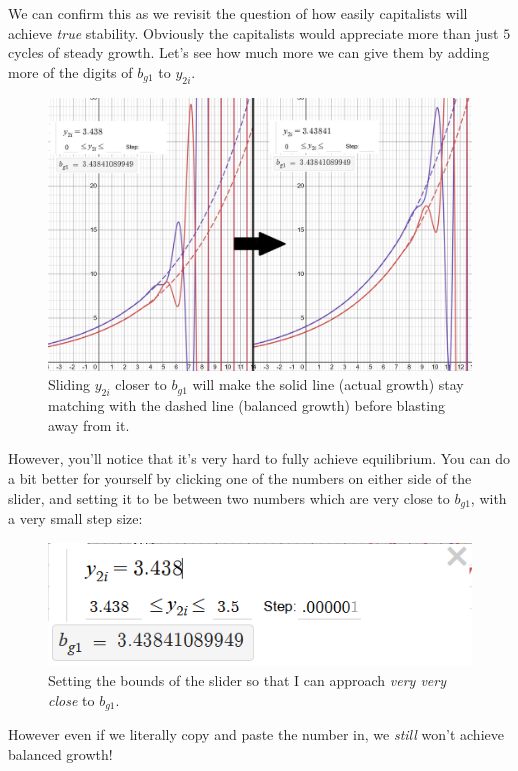 \documentclass{article}
\theoremstyle{theorem}
\begin{document}
We can confirm this as we revisit the question of how easily capitalists will achieve \emph{true} stability. Obviously the capitalists would appreciate more than just $5$ cycles of steady growth. Let's see how much more we can give them by adding more of the digits of $b_{g1}$ to $y_{2i}$. 
\begin{figure}[H]
\centering
\includegraphics[scale=.6]{Images/approachingEQ}
\caption{Sliding $y_{2i}$ closer to $b_{g1}$ will make the solid line (actual growth) stay matching with the dashed line (balanced growth) before blasting away from it.}
\end{figure} 
However, you'll notice that it's very hard to fully achieve equilibrium. You can do a bit better for yourself by clicking one of the numbers on either side of the slider, and setting it to be between two numbers which are very close to $b_{g1}$, with a very small step size:
\begin{figure}[H]
\centering
\includegraphics[scale=1]{Images/morePrecision}
\caption{Setting the bounds of the slider so that I can approach \emph{very very close} to $b_{g1}$.}
\end{figure} 
However even if we literally copy and paste the number in, we \emph{still} won't achieve balanced growth!
\end{document}
